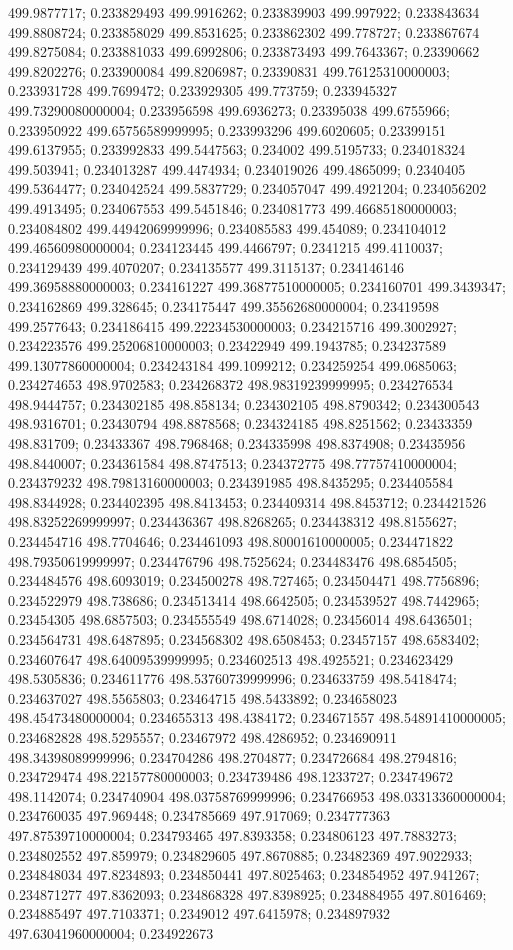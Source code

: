 499.9877717; 0.233829493 499.9916262; 0.233839903 499.997922; 0.233843634 499.8808724; 0.233858029 499.8531625; 0.233862302 499.778727; 0.233867674 499.8275084; 0.233881033 499.6992806; 0.233873493 499.7643367; 0.23390662 499.8202276; 0.233900084 499.8206987; 0.23390831 499.76125310000003; 0.233931728 499.7699472; 0.233929305 499.773759; 0.233945327 499.73290080000004; 0.233956598 499.6936273; 0.23395038 499.6755966; 0.233950922 499.65756589999995; 0.233993296 499.6020605; 0.23399151 499.6137955; 0.233992833 499.5447563; 0.234002 499.5195733; 0.234018324 499.503941; 0.234013287 499.4474934; 0.234019026 499.4865099; 0.2340405 499.5364477; 0.234042524 499.5837729; 0.234057047 499.4921204; 0.234056202 499.4913495; 0.234067553 499.5451846; 0.234081773 499.46685180000003; 0.234084802 499.44942069999996; 0.234085583 499.454089; 0.234104012 499.46560980000004; 0.234123445 499.4466797; 0.2341215 499.4110037; 0.234129439 499.4070207; 0.234135577 499.3115137; 0.234146146 499.36958880000003; 0.234161227 499.36877510000005; 0.234160701 499.3439347; 0.234162869 499.328645; 0.234175447 499.35562680000004; 0.23419598 499.2577643; 0.234186415 499.22234530000003; 0.234215716 499.3002927; 0.234223576 499.25206810000003; 0.23422949 499.1943785; 0.234237589 499.13077860000004; 0.234243184 499.1099212; 0.234259254 499.0685063; 0.234274653 498.9702583; 0.234268372 498.98319239999995; 0.234276534 498.9444757; 0.234302185 498.858134; 0.234302105 498.8790342; 0.234300543 498.9316701; 0.23430794 498.8878568; 0.234324185 498.8251562; 0.23433359 498.831709; 0.23433367 498.7968468; 0.234335998 498.8374908; 0.23435956 498.8440007; 0.234361584 498.8747513; 0.234372775 498.77757410000004; 0.234379232 498.79813160000003; 0.234391985 498.8435295; 0.234405584 498.8344928; 0.234402395 498.8413453; 0.234409314 498.8453712; 0.234421526 498.83252269999997; 0.234436367 498.8268265; 0.234438312 498.8155627; 0.234454716 498.7704646; 0.234461093 498.80001610000005; 0.234471822 498.79350619999997; 0.234476796 498.7525624; 0.234483476 498.6854505; 0.234484576 498.6093019; 0.234500278 498.727465; 0.234504471 498.7756896; 0.234522979 498.738686; 0.234513414 498.6642505; 0.234539527 498.7442965; 0.23454305 498.6857503; 0.234555549 498.6714028; 0.23456014 498.6436501; 0.234564731 498.6487895; 0.234568302 498.6508453; 0.23457157 498.6583402; 0.234607647 498.64009539999995; 0.234602513 498.4925521; 0.234623429 498.5305836; 0.234611776 498.53760739999996; 0.234633759 498.5418474; 0.234637027 498.5565803; 0.23464715 498.5433892; 0.234658023 498.45473480000004; 0.234655313 498.4384172; 0.234671557 498.54891410000005; 0.234682828 498.5295557; 0.23467972 498.4286952; 0.234690911 498.34398089999996; 0.234704286 498.2704877; 0.234726684 498.2794816; 0.234729474 498.22157780000003; 0.234739486 498.1233727; 0.234749672 498.1142074; 0.234740904 498.03758769999996; 0.234766953 498.03313360000004; 0.234760035 497.969448; 0.234785669 497.917069; 0.234777363 497.87539710000004; 0.234793465 497.8393358; 0.234806123 497.7883273; 0.234802552 497.859979; 0.234829605 497.8670885; 0.23482369 497.9022933; 0.234848034 497.8234893; 0.234850441 497.8025463; 0.234854952 497.941267; 0.234871277 497.8362093; 0.234868328 497.8398925; 0.234884955 497.8016469; 0.234885497 497.7103371; 0.2349012 497.6415978; 0.234897932 497.63041960000004; 0.234922673 